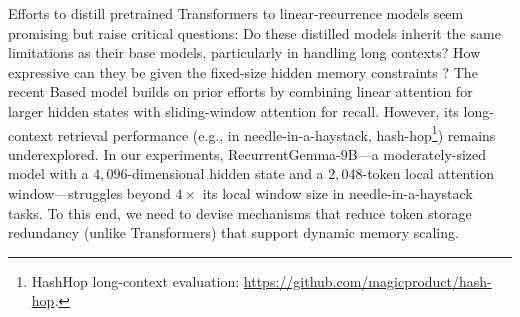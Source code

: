 Efforts to distill pretrained Transformers to linear-recurrence models \citep{zhang_hedgehog_2024,wang_mamba_2024,zhang_lolcats_2024,bick_transformers_2024} seem promising but raise critical questions:
%
Do these distilled models inherit the same limitations as their base models, particularly in handling long contexts?
%
How expressive can they be given the fixed-size hidden memory constraints \citep{jelassi_repeat_2024}?
%
The recent Based model \citep{arora_simple_2024} builds on prior efforts by combining linear attention for larger hidden states with sliding-window attention for recall.
%
However, its long-context retrieval performance (e.g., in needle-in-a-haystack, hash-hop\footnote{HashHop long-context evaluation: \url{https://github.com/magicproduct/hash-hop}.}) remains underexplored.
%
In our experiments, RecurrentGemma-$9$B---a moderately-sized model with a $4,096$-dimensional hidden state and a $2,048$-token local attention window---struggles beyond $4\times$ its local window size in needle-in-a-haystack tasks.
%
To this end, we need to devise mechanisms that reduce token storage redundancy (unlike Transformers) that support dynamic memory scaling.
